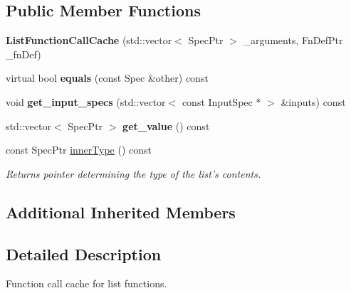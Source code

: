\subsection*{Public Member Functions}
\begin{DoxyCompactItemize}
\item 
\hypertarget{classgiskard__suturo_1_1ListFunctionCallCache_a19bba5c6ba7ab1a8273662594ccdc47a}{{\bfseries List\-Function\-Call\-Cache} (std\-::vector$<$ Spec\-Ptr $>$ \-\_\-arguments, Fn\-Def\-Ptr \-\_\-fn\-Def)}\label{classgiskard__suturo_1_1ListFunctionCallCache_a19bba5c6ba7ab1a8273662594ccdc47a}

\item 
\hypertarget{classgiskard__suturo_1_1ListFunctionCallCache_ae0cf5c8642bb9c43c7fab54e7c03c91b}{virtual bool {\bfseries equals} (const Spec \&other) const }\label{classgiskard__suturo_1_1ListFunctionCallCache_ae0cf5c8642bb9c43c7fab54e7c03c91b}

\item 
\hypertarget{classgiskard__suturo_1_1ListFunctionCallCache_a0dd12fdd635f043a5d7c538272ca88db}{void {\bfseries get\-\_\-input\-\_\-specs} (std\-::vector$<$ const Input\-Spec $\ast$ $>$ \&inputs) const }\label{classgiskard__suturo_1_1ListFunctionCallCache_a0dd12fdd635f043a5d7c538272ca88db}

\item 
\hypertarget{classgiskard__suturo_1_1ListFunctionCallCache_a34c5a6ce86a28d706eb3cc35a39eeb37}{std\-::vector$<$ Spec\-Ptr $>$ {\bfseries get\-\_\-value} () const }\label{classgiskard__suturo_1_1ListFunctionCallCache_a34c5a6ce86a28d706eb3cc35a39eeb37}

\item 
const Spec\-Ptr \hyperlink{classgiskard__suturo_1_1ListFunctionCallCache_a2c1027c8c47611420120e447a9e183f1}{inner\-Type} () const 
\begin{DoxyCompactList}\small\item\em Returns pointer determining the type of the list's contents. \end{DoxyCompactList}\end{DoxyCompactItemize}
\subsection*{Additional Inherited Members}


\subsection{Detailed Description}
Function call cache for list functions. 

